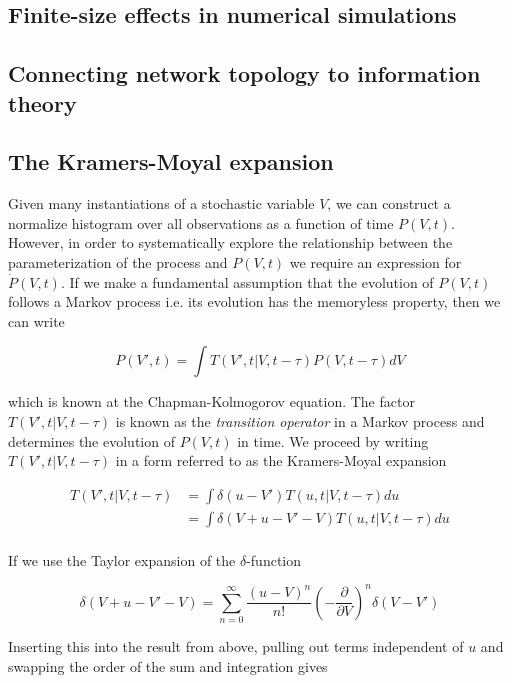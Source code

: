 \documentclass{ucetd}
\begin{document}
\section{Finite-size effects in numerical simulations}

\section{Connecting network topology to information theory}


\begin{appendices}
\chapter{The Kramers-Moyal expansion}

Given many instantiations of a stochastic variable $V$, we can construct a normalize histogram over all observations as a function of time $P(V,t)$. However, in order to systematically explore the relationship between the parameterization of the process and $P(V,t)$ we require an expression for $\dot{P}(V,t)$. If we make a fundamental assumption that the evolution of $P(V,t)$ follows a Markov process i.e. its evolution has the memoryless property, then we can write

\begin{equation}
P(V', t) = \int T(V', t | V, t-\tau)P(V, t-\tau)dV
\end{equation} 

which is known at the Chapman-Kolmogorov equation. The factor $T(V', t | V, t-\tau)$ is known as the \emph{transition operator} in a Markov process and determines the evolution of $P(V,t)$ in time. We proceed by writing $T(V', t | V, t-\tau)$ in a form referred to as the Kramers-Moyal expansion

\begin{align*}
T(V', t | V, t-\tau) &= \int \delta(u-V')T(u, t | V, t-\tau)du\\
&= \int \delta(V+u-V'-V)T(u, t | V, t-\tau)du\\
\end{align*} 

If we use the Taylor expansion of the $\delta$-function 

\begin{equation*}
\delta(V+u-V'-V) = \sum_{n=0}^{\infty} \frac{(u-V)^{n}}{n!}\left(-\frac{\partial}{\partial V}\right)^{n}\delta(V-V')
\end{equation*}

Inserting this into the result from above, pulling out terms independent of $u$ and swapping the order of the sum and integration gives


\end{appendices}
\end{document}
